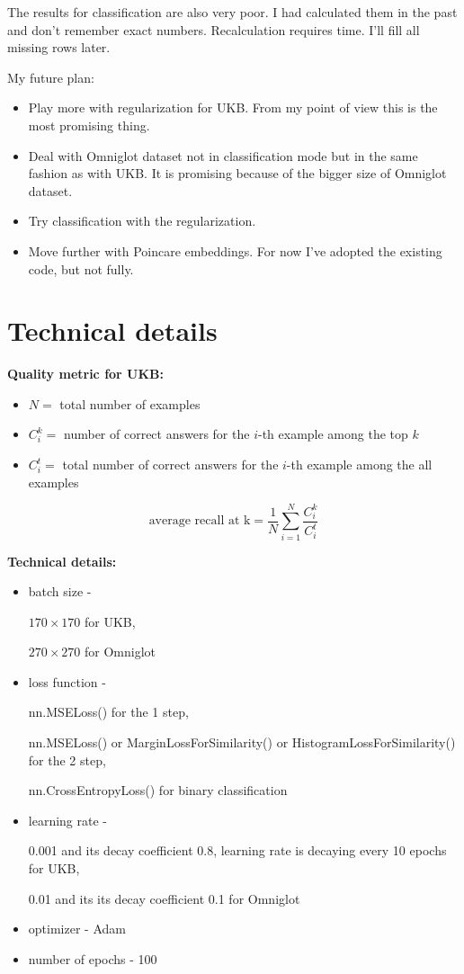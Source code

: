 \documentclass[10pt,a4paper]{article}
\begin{document}
    The results for classification are also very poor. I had calculated them in the past and don't remember exact numbers.
    Recalculation requires time. I'll fill all missing rows later.
    \newline

    My future plan:
    \begin{itemize}
        \item {Play more with regularization for UKB. From my point of view this is the most promising thing.}
        \item {Deal with Omniglot dataset not in classification mode but in the same fashion as with UKB. It is promising because of the bigger size
        of Omniglot dataset.}
        \item {Try classification with the regularization.}
        \item {Move further with Poincare embeddings. For now I've adopted the existing code, but not fully.}
    \end{itemize}



    \section{Technical details}\label{sec:technicalDetails}

    \textbf{Quality metric for UKB:}
    \begin{itemize}
        \item{$N = $ total number of examples}
        \item{$C_i^k = $ number of correct answers for the $i$-th example among the top $k$}
        \item{$C_i^t = $ total number of correct answers for the $i$-th example among the all examples}
    \end{itemize}

    \[\text{average recall at k} = \frac{1}{N}\sum_{i = 1}^{N}
    \frac{C_i^k}{C_i^t}\]

    \textbf{Technical details:}
    \begin{itemize}
        \item{batch size -

        $170 \times 170$ for UKB,

        $270 \times 270$ for Omniglot}
        \item{loss function -

        nn.MSELoss() for the 1 step,

        nn.MSELoss() or MarginLossForSimilarity() or HistogramLossForSimilarity() for the 2 step,

        nn.CrossEntropyLoss() for binary classification}
        \item{learning rate -

        0.001 and its decay coefficient 0.8, learning rate is decaying every 10 epochs for UKB,

        0.01 and its its decay coefficient 0.1 for Omniglot}
        \item{optimizer - Adam}
        \item{number of epochs - 100}
    \end{itemize}
\end{document}
